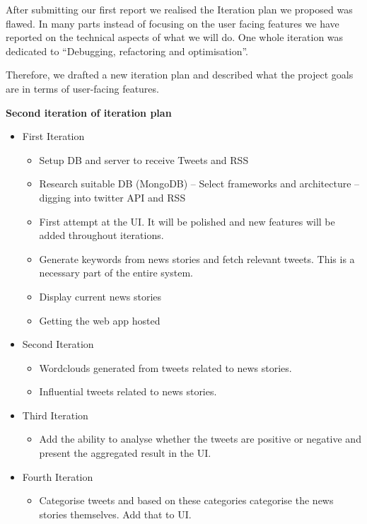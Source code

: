 \documentclass{report}
\begin{document}
		After submitting our first report we realised the Iteration plan we proposed was flawed. In many parts instead of focusing on the user facing features we have reported on the technical aspects of what we will do. One whole iteration was dedicated to “Debugging, refactoring and optimisation”. 

		Therefore, we drafted a new iteration plan and described what the project goals are in terms of user-facing features.
		
		\textbf{Second iteration of iteration plan}
		
		\begin{itemize}
			\item First Iteration
			\begin{itemize}
				\item Setup DB and server to receive Tweets and RSS
				\item Research suitable DB (MongoDB) – Select frameworks and architecture – digging into twitter API and RSS
				\item First attempt at the UI. It will be polished and new features will be added throughout iterations.
				\item Generate keywords from news stories and fetch relevant tweets. This is a necessary part of the entire system.
				\item Display current news stories
				\item Getting the web app hosted
			\end{itemize}
			
			\item Second Iteration
			\begin{itemize}
				\item Wordclouds generated from tweets related to news stories.
				\item Influential tweets related to news stories.
			\end{itemize}
			
			\item Third Iteration
			\begin{itemize}
				\item Add the ability to analyse whether the tweets are positive or negative and present the aggregated result in the UI.
			\end{itemize}
			
			\item Fourth Iteration
			\begin{itemize}
				\item Categorise tweets and based on these categories categorise the news stories themselves. Add that to UI.
			\end{itemize}
			

\end{itemize}
\end{document}
